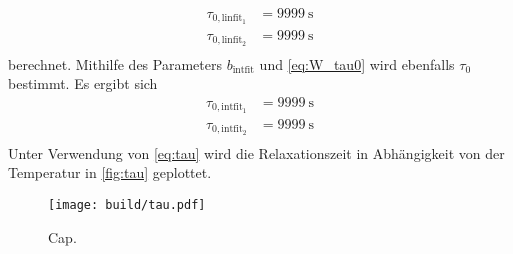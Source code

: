 \begin{align*}
    \tau_{0, \text{linfit}_1} &= \qty{9999}{\second} \\
    \tau_{0, \text{linfit}_2} &= \qty{9999}{\second} \\
\end{align*}
berechnet. 
Mithilfe des Parameters $b_{\text{intfit}}$ und \autoref{eq:W_tau0} wird ebenfalls $\tau_0$ bestimmt. Es ergibt sich
\begin{align*}
    \tau_{0, \text{intfit}_1} &= \qty{9999}{\second} \\
    \tau_{0, \text{intfit}_2} &= \qty{9999}{\second} \\
\end{align*}
Unter Verwendung von \autoref{eq:tau} wird die Relaxationszeit in Abhängigkeit von der Temperatur in \autoref{fig:tau} geplottet.

\begin{figure}
    \centering
    \texttt{[image: build/tau.pdf]}
    \caption{Cap.}
    \label{fig:tau}
\end{figure}











































































